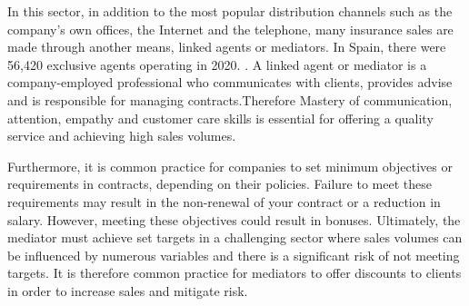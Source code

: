 \documentclass[review]{elsarticle}
\begin{document}
In this sector, in addition to the most popular distribution channels such as the company's own offices, the Internet and the telephone, many insurance sales are made through another means, linked agents or mediators. In Spain, there were 56,420 exclusive agents operating in 2020. \cite{dgsfp2022informe}.
A linked agent or mediator is a company-employed professional who communicates with clients, provides advise and is responsible for managing contracts.Therefore Mastery of communication, attention, empathy and customer care skills is essential for offering a quality service and achieving high sales volumes.

Furthermore, it is common practice for companies to set minimum objectives or requirements in contracts, depending on their policies. Failure to meet these requirements may result in the non-renewal of your contract or a reduction in salary. However, meeting these objectives could result in bonuses.
Ultimately, the mediator must achieve set targets in a challenging sector where sales volumes can be influenced by numerous variables and there is a significant risk of not meeting targets. It is therefore common practice for mediators to offer discounts to clients in order to increase sales and mitigate risk.
\end{document}
